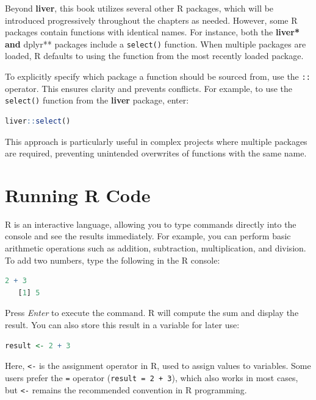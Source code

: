 \documentclass[
]{book}
\newcommand{\passthrough}[1]{#1}
\theoremstyle{definition}
\theoremstyle{definition}
\theoremstyle{definition}
\theoremstyle{definition}
\theoremstyle{remark}
\begin{document}
Beyond \textbf{liver}, this book utilizes several other R packages, which will be introduced progressively throughout the chapters as needed. However, some R packages contain functions with identical names. For instance, both the \textbf{liver* and }dplyr** packages include a \passthrough{\lstinline!select()!} function. When multiple packages are loaded, R defaults to using the function from the most recently loaded package.

To explicitly specify which package a function should be sourced from, use the \passthrough{\lstinline!::!} operator. This ensures clarity and prevents conflicts. For example, to use the \passthrough{\lstinline!select()!} function from the \textbf{liver} package, enter:

\begin{lstlisting}[language=R]
liver::select()
\end{lstlisting}

This approach is particularly useful in complex projects where multiple packages are required, preventing unintended overwrites of functions with the same name.

\section{Running R Code}\label{running-r-code}

R is an interactive language, allowing you to type commands directly into the console and see the results immediately. For example, you can perform basic arithmetic operations such as addition, subtraction, multiplication, and division. To add two numbers, type the following in the R console:

\begin{lstlisting}[language=R]
2 + 3
   [1] 5
\end{lstlisting}

Press \emph{Enter} to execute the command. R will compute the sum and display the result. You can also store this result in a variable for later use:

\begin{lstlisting}[language=R]
result <- 2 + 3
\end{lstlisting}

Here, \passthrough{\lstinline!<-!} is the assignment operator in R, used to assign values to variables. Some users prefer the \passthrough{\lstinline!=!} operator (\passthrough{\lstinline!result = 2 + 3!}), which also works in most cases, but \passthrough{\lstinline!<-!} remains the recommended convention in R programming.
\end{document}
